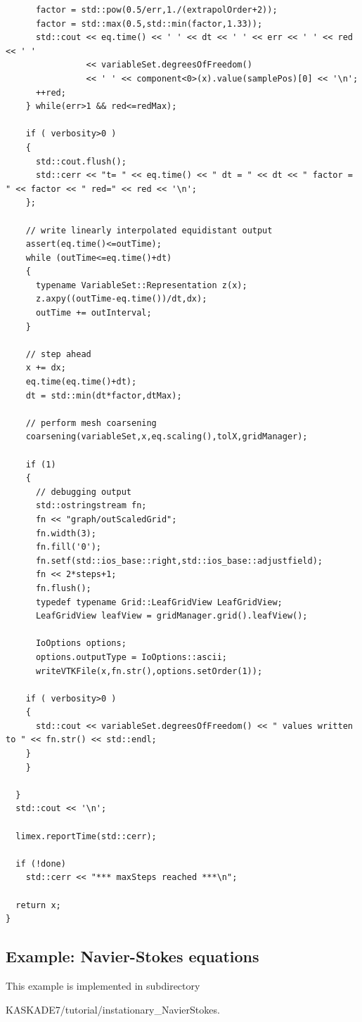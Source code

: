 \documentclass[11pt]{article}
\begin{document}
\begin{lstlisting}
      factor = std::pow(0.5/err,1./(extrapolOrder+2));
      factor = std::max(0.5,std::min(factor,1.33));
      std::cout << eq.time() << ' ' << dt << ' ' << err << ' ' << red << ' ' 
                << variableSet.degreesOfFreedom()
                << ' ' << component<0>(x).value(samplePos)[0] << '\n';
      ++red;
    } while(err>1 && red<=redMax);

    if ( verbosity>0 ) 
    {
      std::cout.flush();
      std::cerr << "t= " << eq.time() << " dt = " << dt << " factor = " << factor << " red=" << red << '\n';
    };

    // write linearly interpolated equidistant output
    assert(eq.time()<=outTime);
    while (outTime<=eq.time()+dt) 
    {
      typename VariableSet::Representation z(x);
      z.axpy((outTime-eq.time())/dt,dx);
      outTime += outInterval;
    }

    // step ahead
    x += dx;
    eq.time(eq.time()+dt);
    dt = std::min(dt*factor,dtMax);

    // perform mesh coarsening
    coarsening(variableSet,x,eq.scaling(),tolX,gridManager);
    
    if (1) 
    {
      // debugging output
      std::ostringstream fn;
      fn << "graph/outScaledGrid";
      fn.width(3);
      fn.fill('0');
      fn.setf(std::ios_base::right,std::ios_base::adjustfield);
      fn << 2*steps+1;
      fn.flush();
      typedef typename Grid::LeafGridView LeafGridView;
      LeafGridView leafView = gridManager.grid().leafView();
    
      IoOptions options;
      options.outputType = IoOptions::ascii;
      writeVTKFile(x,fn.str(),options.setOrder(1));

    if ( verbosity>0 ) 
    {
      std::cout << variableSet.degreesOfFreedom() << " values written to " << fn.str() << std::endl;
    }
    }
    
  }
  std::cout << '\n';

  limex.reportTime(std::cerr);

  if (!done)
    std::cerr << "*** maxSteps reached ***\n";

  return x;
}
\end{lstlisting}



\subsection{Example: Navier-Stokes equations}\label{NavierStokesEq}
This example is implemented in subdirectory 
\begin{center} KASKADE7/tutorial/instationary\_NavierStokes.\end{center}
\end{document}
